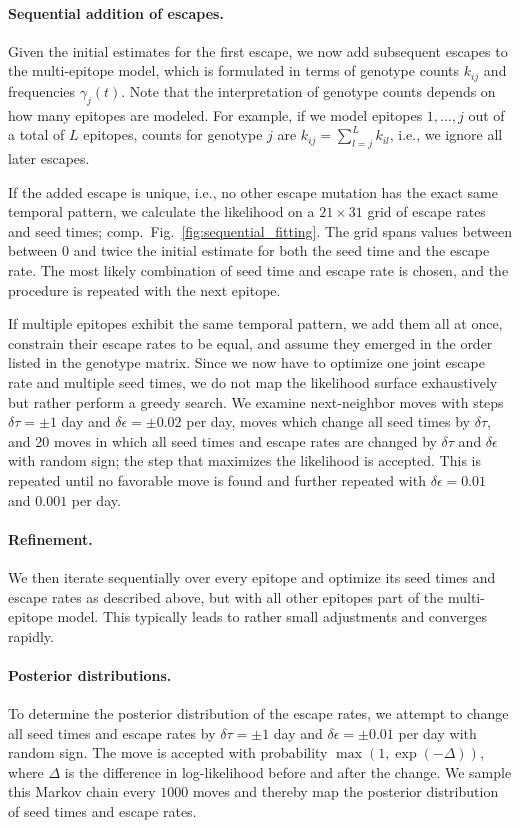 \documentclass{frontiers}
\newcommand{\FIG}[1]{Fig.~\ref{fig:#1}}
\newcommand{\gtfreq}{\gamma}
\newcommand{\fcoeff}{\epsilon}
\begin{document}
\paragraph*{Sequential addition of escapes.} 
Given the initial estimates for the first escape, we now add subsequent escapes
to the multi-epitope model, which is formulated in terms of genotype counts
$k_{ij}$ and frequencies $\gtfreq_j(t)$. Note that the interpretation of
genotype counts depends on how many epitopes are modeled. For example, if we
model epitopes $1,\ldots,j$ out of a total of $L$ epitopes, counts for genotype
$j$ are $k_{ij} = \sum_{l=j}^{L}k_{il}$, i.e., we ignore all later escapes. 

If the added escape is unique, i.e., no other escape mutation has the exact
same temporal pattern, we calculate the likelihood on a $21\times 31$ grid
of escape rates and seed times; comp.~\FIG{sequential_fitting}. The grid spans values between between 0 and twice the
initial estimate for both the seed time and the escape rate. 
The most likely combination of seed time and escape rate is
chosen, and the procedure is repeated with the next epitope.

If multiple epitopes exhibit the same temporal pattern, we add them all at once,
constrain their escape rates to be equal, and assume they emerged in the order
listed in the genotype matrix. Since we now have to optimize one joint escape
rate and multiple seed times, we do not map the likelihood surface
exhaustively but rather perform a greedy search. We examine next-neighbor moves with
steps $\delta \tau = \pm 1$ day and $\delta \fcoeff = \pm 0.02$ per day, moves
which change all seed times by $\delta \tau$, and 20 moves in which all seed times and
escape rates are changed by $\delta \tau$ and $\delta \fcoeff$ with random
sign; the step that maximizes the likelihood is accepted.
This is repeated until no favorable move is found and further repeated with 
$\delta \fcoeff = 0.01$ and $0.001$ per day.

\paragraph*{Refinement.}
We then iterate sequentially over every epitope and optimize its seed times and
escape rates as described above, but with all other epitopes part of the
multi-epitope model. This typically leads to rather small adjustments and
converges rapidly.

\paragraph*{Posterior distributions.}
To determine the posterior distribution of the escape rates, we attempt to
change all seed times and escape rates by $\delta \tau = \pm 1$ day and $\delta
\fcoeff = \pm 0.01$ per day with random sign. The move is accepted with
probability $\max(1,\exp(-\Delta))$, where $\Delta$ is the difference in
log-likelihood before and after the change. We sample this Markov chain every
$1000$ moves and thereby map the posterior distribution of seed times and escape
rates.
\end{document}
